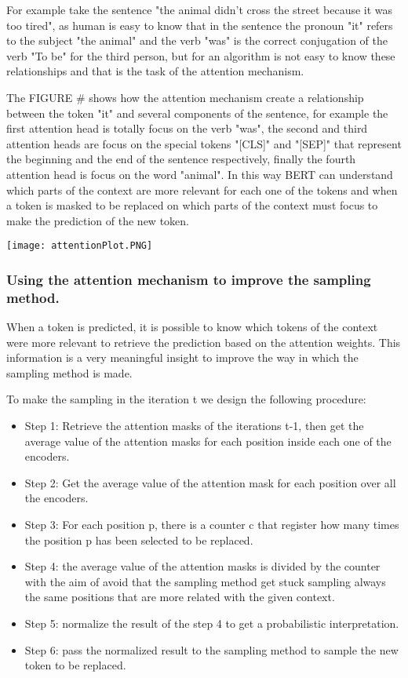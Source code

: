 \documentclass[10pt,twocolumn,letterpaper]{article}
\begin{document}
For example take the sentence "the animal didn't cross the street because it was too tired",
as human is easy to know that in the sentence the pronoun "it" refers to the subject "the animal"
and the verb "was" is the correct conjugation of the verb "To be" for the third person, but for an
algorithm is not easy to know these relationships and that is the task of the attention mechanism.

The FIGURE # shows how the attention mechanism create a relationship between the token "it" and several components
of the sentence, for example the first attention head is totally focus on the verb "was", the second and third
attention heads are focus on the special tokens "[CLS]" and "[SEP]" that represent the beginning and the end of
the sentence respectively, finally the fourth attention head is focus on the word "animal". In this way BERT
can understand which parts of the context are more relevant for each one of the tokens and when a token
is masked to be replaced on which parts of the context must focus to make the prediction of the new token.

\texttt{[image: attentionPlot.PNG]}

\subsubsection{Using the attention mechanism to improve the sampling method.}
When a token is predicted, it is possible to know which tokens of the context were more relevant to
retrieve the prediction based on the attention weights. This information is a very meaningful insight to improve
the way in which the sampling method is made.

To make the sampling in the iteration t we design the following procedure:

\begin{itemize}
\item Step 1: Retrieve the attention masks of the iterations t-1, then get the average value of the attention masks for each position inside each one of the encoders.
\item Step 2: Get the average value of the attention mask for each position over all the encoders.
\item Step 3: For each position p, there is a counter c that register how many times the position p has been selected to be replaced.
\item Step 4: the average value of the attention masks is divided by the counter with the aim of avoid that the sampling method get stuck sampling always the same positions that are more related with the given context.
\item Step 5: normalize the result of the step 4 to get a probabilistic interpretation.
\item Step 6: pass the normalized result to the sampling method to sample the new token to be replaced.
\end{itemize}
\end{document}
